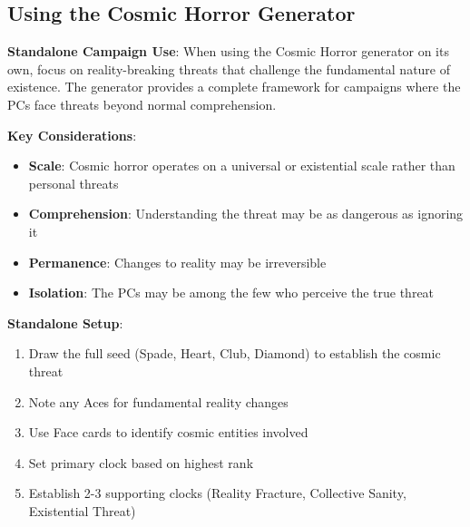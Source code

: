 \documentclass[11pt]{article}
\begin{document}
\subsection*{Using the Cosmic Horror Generator}

\begin{mdframed}[backgroundcolor=horrorbg]
\textbf{Standalone Campaign Use}:
When using the Cosmic Horror generator on its own, focus on reality-breaking threats that challenge the fundamental nature of existence. The generator provides a complete framework for campaigns where the PCs face threats beyond normal comprehension.

\textbf{Key Considerations}:
\begin{itemize}[leftmargin=*]
\item \textbf{Scale}: Cosmic horror operates on a universal or existential scale rather than personal threats
\item \textbf{Comprehension}: Understanding the threat may be as dangerous as ignoring it
\item \textbf{Permanence}: Changes to reality may be irreversible
\item \textbf{Isolation}: The PCs may be among the few who perceive the true threat
\end{itemize}

\textbf{Standalone Setup}:
\begin{enumerate}[leftmargin=*]
\item Draw the full seed (Spade, Heart, Club, Diamond) to establish the cosmic threat
\item Note any Aces for fundamental reality changes
\item Use Face cards to identify cosmic entities involved
\item Set primary clock based on highest rank
\item Establish 2-3 supporting clocks (Reality Fracture, Collective Sanity, Existential Threat)
\end{enumerate}
\end{mdframed}
\end{document}
